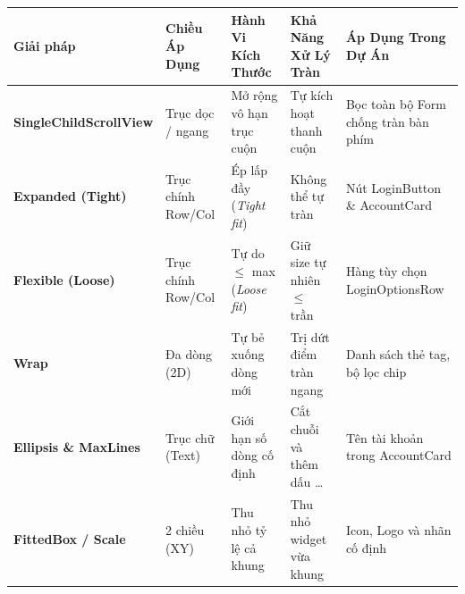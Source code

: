 \documentclass[aspectratio=169, 10pt]{beamer}
\newcommand{\SlideHeader}[2]{%
  \noindent{\textcolor{AccentOrange}{\textbf{\footnotesize #1}}}\\[0.08cm]
  \noindent{\Large \textbf{\textcolor{NavyTitle}{#2}}}\\[0.22cm]
}
\begin{document}
\begin{frame}
  \SlideHeader{PHÂN TÍCH CHUYÊN SÂU}{Bảng So Sánh Toàn Diện Các Giải Pháp Xử Lý Overflow}

  \centering
  \renewcommand{\arraystretch}{1.2}
  {\scriptsize
  \begin{tabular}{p{2.6cm}p{1.9cm}p{2.3cm}p{2.5cm}p{3.3cm}}
    \toprule
    \rowcolor{TableHeadBg}
    \textbf{Giải pháp} & \textbf{Chiều Áp Dụng} & \textbf{Hành Vi Kích Thước} & \textbf{Khả Năng Xử Lý Tràn} & \textbf{Áp Dụng Trong Dự Án} \\
    \midrule
    \textbf{SingleChildScrollView} & Trục dọc / ngang & Mở rộng vô hạn trục cuộn & Tự kích hoạt thanh cuộn & Bọc toàn bộ Form chống tràn bàn phím \\
    \rowcolor{TableAltBg}
    \textbf{Expanded (Tight)} & Trục chính Row/Col & Ép lấp đầy (\textit{Tight fit}) & Không thể tự tràn & Nút LoginButton \& AccountCard \\
    \textbf{Flexible (Loose)} & Trục chính Row/Col & Tự do $\le$ max (\textit{Loose fit}) & Giữ size tự nhiên $\le$ trần & Hàng tùy chọn LoginOptionsRow \\
    \rowcolor{TableAltBg}
    \textbf{Wrap} & Đa dòng (2D) & Tự bẻ xuống dòng mới & Trị dứt điểm tràn ngang & Danh sách thẻ tag, bộ lọc chip \\
    \textbf{Ellipsis \& MaxLines} & Trục chữ (Text) & Giới hạn số dòng cố định & Cắt chuỗi và thêm dấu \dots & Tên tài khoản trong AccountCard \\
    \rowcolor{TableAltBg}
    \textbf{FittedBox / Scale} & 2 chiều (XY) & Thu nhỏ tỷ lệ cả khung & Thu nhỏ widget vừa khung & Icon, Logo và nhãn cố định \\
    \bottomrule
  \end{tabular}
  }
\end{frame}
\end{document}
